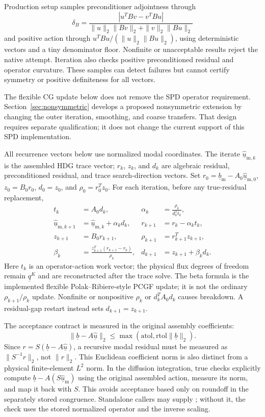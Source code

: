 \documentclass[11pt]{article}
\numberwithin{equation}{section}
\numberwithin{figure}{section}
\numberwithin{table}{section}
\newcommand{\code}[1]{\texttt{\detokenize{#1}}}
\begin{document}
Production setup samples preconditioner adjointness through
\[
 \delta_B=\frac{|u^TBv-v^TBu|}
 {\|u\|_2\|Bv\|_2+\|v\|_2\|Bu\|_2}
\]
and positive action through $u^TBu/(\|u\|_2\|Bu\|_2)$, using deterministic
vectors and a tiny denominator floor. Nonfinite or unacceptable results reject
the native attempt. Iteration also checks positive preconditioned residual
and operator curvature. These samples can detect failures but cannot certify
symmetry or positive definiteness for all vectors.

The flexible CG update below does not remove the SPD operator requirement.
Section~\ref{sec:nonsymmetric} develops a proposed nonsymmetric extension by
changing the outer iteration, smoothing, and coarse transfers. That design
requires separate qualification; it does not change the current support of
this SPD implementation.

All recurrence vectors below use normalized modal coordinates. The iterate
$\underline{\widehat{u}}_{\mathrm{m},k}$ is the assembled HDG trace vector;
$r_k$, $z_k$, and $d_k$ are algebraic residual, preconditioned residual, and
trace search-direction vectors. Set
$r_0=\underline{b}_{\mathrm{m}}
-A_0\underline{\widehat{u}}_{\mathrm{m},0}$, $z_0=B_0r_0$, $d_0=z_0$, and $\rho_0=r_0^Tz_0$.
For each iteration, before any true-residual replacement,
\begin{align*}
 t_k&=A_0d_k,& \alpha_k&=\frac{\rho_k}{d_k^Tt_k},\\
 \underline{\widehat{u}}_{\mathrm{m},k+1}
 &=\underline{\widehat{u}}_{\mathrm{m},k}+\alpha_kd_k,&
 r_{k+1}&=r_k-\alpha_kt_k,\\
 z_{k+1}&=B_0r_{k+1},& \rho_{k+1}&=r_{k+1}^Tz_{k+1},\\
 \beta_k&=\frac{z_{k+1}^T(r_{k+1}-r_k)}{\rho_k},&
 d_{k+1}&=z_{k+1}+\beta_kd_k.
\end{align*}
Here $t_k$ is an operator-action work vector; the physical flux degrees of
freedom remain $\underline{q}^K$ and are reconstructed after the trace solve.
The beta formula is the implemented flexible Polak--Ribiere-style PCGF update;
it is not the ordinary $\rho_{k+1}/\rho_k$ update. Nonfinite or nonpositive
$\rho_k$ or $d_k^TA_0d_k$ causes breakdown. A residual-gap restart instead sets
$d_{k+1}=z_{k+1}$.

The acceptance contract is measured in the original assembly coefficients:
\begin{equation}\label{eq:acceptance}
 \|\underline{b}-A\underline{\widehat{u}}\|_2
 \leq\max(\mathrm{atol},\mathrm{rtol}\|\underline{b}\|_2).
\end{equation}
Since $r=S(\underline{b}-A\underline{\widehat{u}})$, a recursive modal residual must be measured as
$\|S^{-1}r\|_2$, not $\|r\|_2$. This Euclidean coefficient norm is also distinct
from a physical finite-element $L^2$ norm.
In the diffusion integration, true checks explicitly compute $\underline{b}-A(S\underline{\widehat{u}}_{\mathrm{m}})$ using
the original assembled action, measure its norm, and map it back with $S$.
This avoids acceptance based only on roundoff in the separately stored
congruence. Standalone callers may supply \code{assembly_matvec}; without it,
the check uses the stored normalized operator and the inverse scaling.
\end{document}

